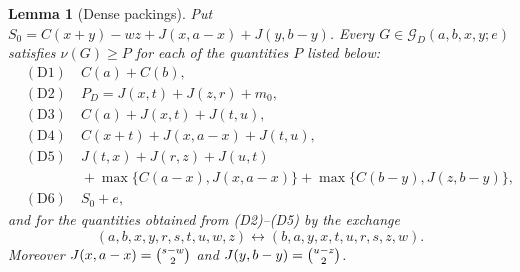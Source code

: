 \documentclass{amsart}
\newtheorem{lemma}[theorem]{Lemma}
\theoremstyle{definition}
\numberwithin{equation}{section}
\numberwithin{table}{section}
\newcommand{\binomtwo}[1]{\tbinom{#1}{2}}
\begin{document}
\begin{lemma}[Dense packings]\label{lem:dense-packings}
Put $S_0=C(x+y)-wz+J(x,a-x)+J(y,b-y)$. Every $G\in\mathcal G_D(a,b,x,y;e)$ satisfies $\nu(G)\ge P$ for each of the quantities $P$ listed below:
{\allowdisplaybreaks
\begin{align*}
&(\mathrm{D}1)\quad C(a)+C(b),\\
&(\mathrm{D}2)\quad P_D=J(x,t)+J(z,r)+m_0,\\
&(\mathrm{D}3)\quad C(a)+J(x,t)+J(t,u),\\
&(\mathrm{D}4)\quad C(x+t)+J(x,a-x)+J(t,u),\\
&(\mathrm{D}5)\quad J(t,x)+J(r,z)+J(u,t)\\
&\qquad\qquad +\max\{C(a-x),J(x,a-x)\}+\max\{C(b-y),J(z,b-y)\},\\
&(\mathrm{D}6)\quad S_0+e,
\end{align*}}
and for the quantities obtained from (D2)--(D5) by the exchange
\[
(a,b,x,y,r,s,t,u,w,z)\leftrightarrow(b,a,y,x,t,u,r,s,z,w).
\] Moreover $J(x,a-x)=\binomtwo{s-w}$ and $J(y,b-y)=\binomtwo{u-z}$.
\end{lemma}
\end{document}
